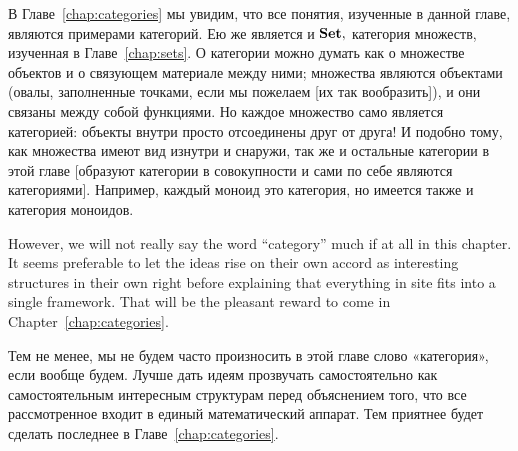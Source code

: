 \documentclass[../main/CT4S-EN-RU]{subfiles}
\begin{document}
\begin{blockRUS}
В Главе~\ref{chap:categories} мы увидим, что все понятия, изученные в данной главе, являются примерами категорий. Ею же является и ${\mathbf{Set}},$ категория множеств, изученная в Главе~\ref{chap:sets}. О категории можно думать как о множестве объектов и о связующем материале между ними; множества являются объектами (овалы, заполненные точками, если мы пожелаем [их так вообразить]), и они связаны между собой функциями. Но каждое множество само является категорией: объекты внутри просто отсоединены друг от друга! И подобно тому, как множества имеют вид изнутри и снаружи, так же и остальные категории в этой главе [образуют категории в совокупности и сами по себе являются категориями]. Например, каждый моноид это категория, но имеется также и категория моноидов. 
\end{blockRUS}

\begin{blockENG}
However, we will not really say the word “category” much if at all in this chapter. It seems preferable to let the ideas rise on their own accord as interesting structures in their own right before explaining that everything in site fits into a single framework. That will be the pleasant reward to come in Chapter~\ref{chap:categories}.
\end{blockENG}

\begin{blockRUS}
Тем не менее, мы не будем часто произносить в этой главе слово «категория», если вообще будем. Лучше дать идеям прозвучать самостоятельно как самостоятельным интересным структурам перед объяснением того, что все рассмотренное входит в единый математический аппарат. Тем приятнее будет сделать последнее в Главе~\ref{chap:categories}.
\end{blockRUS}
\end{document}
